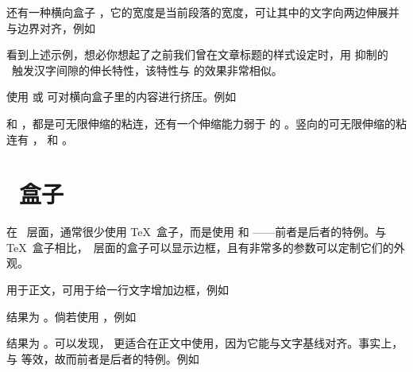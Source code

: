 还有一种横向盒子 \type{\line}，它的宽度是当前段落的宽度，可让其中的文字向两边伸展并与边界对齐，例如

\starttyping[option=TEX]
\stoptyping
{}

看到上述示例，想必你想起了之前我们曾在文章标题的样式设定时，用  抑制的 \ConTeXt\ 触发汉字间隙的伸长特性，该特性与\type{\line} 的效果非常相似。

使用 \type{\hfill} 或 \type{\hss} 可对横向盒子里的内容进行挤压。例如

\starttyping[option=TEX]
\stoptyping


\type{\hfill} 和 \type{\hss}，都是可无限伸缩的粘连，还有一个伸缩能力弱于 \type{\hfill} 的 \type{\hfil}。竖向的可无限伸缩的粘连有 \type{\vfil}，\type{\vfill} 和 \type{\vss}。

\section{\ConTeXt\ 盒子}

在 \ConTeXt\ 层面，通常很少使用 \TeX\ 盒子，而是使用 \type{\inframed} 和 \type{\framed}——前者是后者的特例。与 \TeX\ 盒子相比，\ConTeXt\ 层面的盒子可以显示边框，且有非常多的参数可以定制它们的外观。

\type{\inframed} 用于正文，可用于给一行文字增加边框，例如

\starttyping[option=TEX]
\stoptyping

\noindent 结果为 。倘若使用 \type{\framed}，例如

\starttyping[option=TEX]
\stoptyping

\noindent 结果为 。可以发现，\type{\inframed} 更适合在正文中使用，因为它能与文字基线对齐。事实上，\type{\inframed} 与 \type{\framed[location=low]} 等效，故而前者是后者的特例。例如


